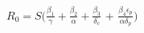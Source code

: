 \documentclass[preview]{standalone}
\begin{document}
\begin{center}
$R_0 = S (\frac{\beta_1}{\gamma} + \frac{\beta_2}{\alpha} + \frac{\beta_3}{\delta_c}$ + $\frac{\beta_4 \epsilon_p}{\alpha \delta_p})$
\end{center}
\end{document}
